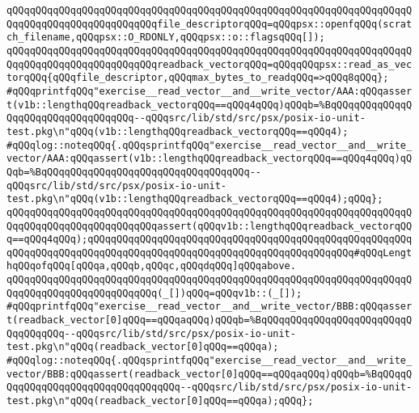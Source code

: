 \newline
\newline
\newline
\verb|qQQqqQQqqQQqqQQqqQQqqQQqqQQqqQQqqQQqqQQqqQQqqQQqqQQqqQQqqQQqqQQqqQQqqQQqqQQqqQQqqQQqqQQqqQQqqQQqfile_descriptorqQQq=qQQqpsx::openfqQQq(scratch_filename,qQQqpsx::O_RDONLY,qQQqpsx::o::flagsqQQq[]);|\newline
\newline
\verb|qQQqqQQqqQQqqQQqqQQqqQQqqQQqqQQqqQQqqQQqqQQqqQQqqQQqqQQqqQQqqQQqqQQqqQQqqQQqqQQqqQQqqQQqqQQqqQQqreadback_vectorqQQq=qQQqqQQqpsx::read_as_vectorqQQq{qQQqfile_descriptor,qQQqmax_bytes_to_readqQQq=>qQQq8qQQq};|\newline
\newline
\verb|#qQQqprintfqQQq"exercise__read_vector__and__write_vector/AAA:qQQqassert(v1b::lengthqQQqreadback_vectorqQQq==qQQq4qQQq)qQQqb=%BqQQqqQQqqQQqqQQqqQQqqQQqqQQqqQQqqQQq--qQQqsrc/lib/std/src/psx/posix-io-unit-test.pkg\n"qQQq(v1b::lengthqQQqreadback_vectorqQQq==qQQq4);|\newline
\verb|#qQQqlog::noteqQQq{.qQQqsprintfqQQq"exercise__read_vector__and__write_vector/AAA:qQQqassert(v1b::lengthqQQqreadback_vectorqQQq==qQQq4qQQq)qQQqb=%BqQQqqQQqqQQqqQQqqQQqqQQqqQQqqQQqqQQq--qQQqsrc/lib/std/src/psx/posix-io-unit-test.pkg\n"qQQq(v1b::lengthqQQqreadback_vectorqQQq==qQQq4);qQQq};|\newline
\verb|qQQqqQQqqQQqqQQqqQQqqQQqqQQqqQQqqQQqqQQqqQQqqQQqqQQqqQQqqQQqqQQqqQQqqQQqqQQqqQQqqQQqqQQqqQQqqQQqassert(qQQqv1b::lengthqQQqreadback_vectorqQQq==qQQq4qQQq);qQQqqQQqqQQqqQQqqQQqqQQqqQQqqQQqqQQqqQQqqQQqqQQqqQQqqQQqqQQqqQQqqQQqqQQqqQQqqQQqqQQqqQQqqQQqqQQqqQQqqQQqqQQqqQQqqQQq#qQQqLengthqQQqofqQQq[qQQqa,qQQqb,qQQqc,qQQqdqQQq]qQQqabove.|\newline
\newline
\verb|qQQqqQQqqQQqqQQqqQQqqQQqqQQqqQQqqQQqqQQqqQQqqQQqqQQqqQQqqQQqqQQqqQQqqQQqqQQqqQQqqQQqqQQqqQQqqQQq(_[])qQQq=qQQqv1b::(_[]);|\newline
\newline
\verb|#qQQqprintfqQQq"exercise__read_vector__and__write_vector/BBB:qQQqassert(readback_vector[0]qQQq==qQQqaqQQq)qQQqb=%BqQQqqQQqqQQqqQQqqQQqqQQqqQQqqQQqqQQq--qQQqsrc/lib/std/src/psx/posix-io-unit-test.pkg\n"qQQq(readback_vector[0]qQQq==qQQqa);|\newline
\verb|#qQQqlog::noteqQQq{.qQQqsprintfqQQq"exercise__read_vector__and__write_vector/BBB:qQQqassert(readback_vector[0]qQQq==qQQqaqQQq)qQQqb=%BqQQqqQQqqQQqqQQqqQQqqQQqqQQqqQQqqQQq--qQQqsrc/lib/std/src/psx/posix-io-unit-test.pkg\n"qQQq(readback_vector[0]qQQq==qQQqa);qQQq};|\newline
